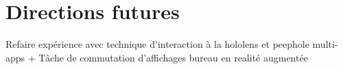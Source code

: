 \chapter{Directions futures}
\label{ch:futur_work}

Refaire expérience avec technique d'interaction à la hololens et peephole
multi-apps + Tâche de commutation d'affichages
bureau en realité augmentée